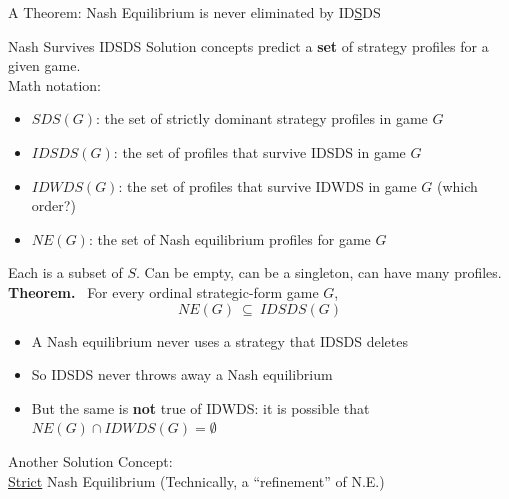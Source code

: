 \begin{frame}[standout]
A Theorem:
\bsk
Nash Equilibrium is never eliminated by ID\underline{S}DS    
\end{frame}

\begin{frame}{Nash Survives IDSDS}
Solution concepts predict a \textbf{set} of strategy profiles for a given game.\\
Math notation:
\begin{itemize}
    \item $SDS(G)$: the set of strictly dominant strategy profiles in game $G$
    \item $IDSDS(G)$: the set of profiles that survive IDSDS in game $G$
    \item $IDWDS(G)$: the set of profiles that survive IDWDS in game $G$ (which order?)
    \item $NE(G)$: the set of Nash equilibrium profiles for game $G$
\end{itemize}
Each is a subset of $S$. Can be empty, can be a singleton, can have many profiles.
\vfill
\textbf{Theorem.} \ For every ordinal strategic-form game $G$,
$$NE(G)\ \subseteq\ IDSDS(G)$$
\begin{itemize}
    \item A Nash equilibrium never uses a strategy that IDSDS deletes
    \item So IDSDS never throws away a Nash equilibrium
    \item But the same is \textbf{not} true of IDWDS: it is possible that $NE(G)\cap IDWDS(G)=\emptyset$
\end{itemize}
\vspace{-0.3in}
\end{frame}

\begin{frame}[standout]
Another Solution Concept:\\
\uline{Strict} Nash Equilibrium
\bsk
{\small (Technically, a ``refinement'' of N.E.)}
    
\end{frame}

